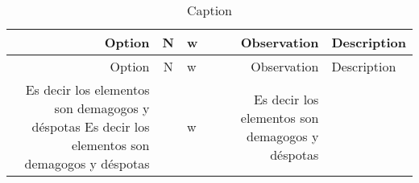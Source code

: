 \documentclass[10pt,]{krantz}
\theoremstyle{definition}
\theoremstyle{definition}
\theoremstyle{definition}
\theoremstyle{remark}
\begin{document}
\begin{longtable}[]{@{}rclrl@{}}
\caption{\label{tab:ww1} Caption}\tabularnewline
\toprule
\begin{minipage}[b]{0.26\columnwidth}\raggedleft
Option\strut
\end{minipage} & \begin{minipage}[b]{0.08\columnwidth}\centering
N\strut
\end{minipage} & \begin{minipage}[b]{0.03\columnwidth}\raggedright
w\strut
\end{minipage} & \begin{minipage}[b]{0.23\columnwidth}\raggedleft
Observation\strut
\end{minipage} & \begin{minipage}[b]{0.26\columnwidth}\raggedright
Description\strut
\end{minipage}\tabularnewline
\midrule
\endfirsthead
\toprule
\begin{minipage}[b]{0.26\columnwidth}\raggedleft
Option\strut
\end{minipage} & \begin{minipage}[b]{0.08\columnwidth}\centering
N\strut
\end{minipage} & \begin{minipage}[b]{0.03\columnwidth}\raggedright
w\strut
\end{minipage} & \begin{minipage}[b]{0.23\columnwidth}\raggedleft
Observation\strut
\end{minipage} & \begin{minipage}[b]{0.26\columnwidth}\raggedright
Description\strut
\end{minipage}\tabularnewline
\midrule
\endhead
\begin{minipage}[t]{0.26\columnwidth}\raggedleft
Es decir los elementos son demagogos y déspotas Es decir los elementos son demagogos y déspotas\strut
\end{minipage} & \begin{minipage}[t]{0.08\columnwidth}\centering
1\strut
\end{minipage} & \begin{minipage}[t]{0.03\columnwidth}\raggedright
w\strut
\end{minipage} & \begin{minipage}[t]{0.23\columnwidth}\raggedleft
Es decir los elementos son demagogos y déspotas\strut
\end{minipage} & \begin{minipage}[t]{0.26\columnwidth}\raggedright

\end{minipage}
\end{longtable}
\end{document}
